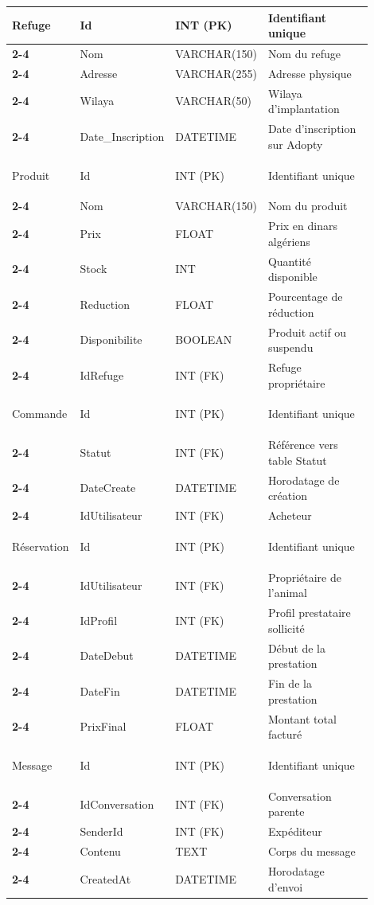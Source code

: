 \documentclass[12pt,a4paper]{report}
\begin{document}
\begin{small}
\begin{longtable}{|>{\bfseries}p{0.15\linewidth}|p{0.18\linewidth}|p{0.14\linewidth}|p{0.43\linewidth}|}
Refuge & Id & INT (PK) & Identifiant unique \\ \cline{2-4}
 & Nom & VARCHAR(150) & Nom du refuge \\ \cline{2-4}
 & Adresse & VARCHAR(255) & Adresse physique \\ \cline{2-4}
 & Wilaya & VARCHAR(50) & Wilaya d'implantation \\ \cline{2-4}
 & Date\_Inscription & DATETIME & Date d'inscription sur Adopty \\ \hline

Produit & Id & INT (PK) & Identifiant unique \\ \cline{2-4}
 & Nom & VARCHAR(150) & Nom du produit \\ \cline{2-4}
 & Prix & FLOAT & Prix en dinars algériens \\ \cline{2-4}
 & Stock & INT & Quantité disponible \\ \cline{2-4}
 & Reduction & FLOAT & Pourcentage de réduction \\ \cline{2-4}
 & Disponibilite & BOOLEAN & Produit actif ou suspendu \\ \cline{2-4}
 & IdRefuge & INT (FK) & Refuge propriétaire \\ \hline

Commande & Id & INT (PK) & Identifiant unique \\ \cline{2-4}
 & Statut & INT (FK) & Référence vers table Statut \\ \cline{2-4}
 & DateCreate & DATETIME & Horodatage de création \\ \cline{2-4}
 & IdUtilisateur & INT (FK) & Acheteur \\ \hline

Réservation & Id & INT (PK) & Identifiant unique \\ \cline{2-4}
 & IdUtilisateur & INT (FK) & Propriétaire de l'animal \\ \cline{2-4}
 & IdProfil & INT (FK) & Profil prestataire sollicité \\ \cline{2-4}
 & DateDebut & DATETIME & Début de la prestation \\ \cline{2-4}
 & DateFin & DATETIME & Fin de la prestation \\ \cline{2-4}
 & PrixFinal & FLOAT & Montant total facturé \\ \hline

Message & Id & INT (PK) & Identifiant unique \\ \cline{2-4}
 & IdConversation & INT (FK) & Conversation parente \\ \cline{2-4}
 & SenderId & INT (FK) & Expéditeur \\ \cline{2-4}
 & Contenu & TEXT & Corps du message \\ \cline{2-4}
 & CreatedAt & DATETIME & Horodatage d'envoi \\ \hline


\end{longtable}
\end{small}
\end{document}
